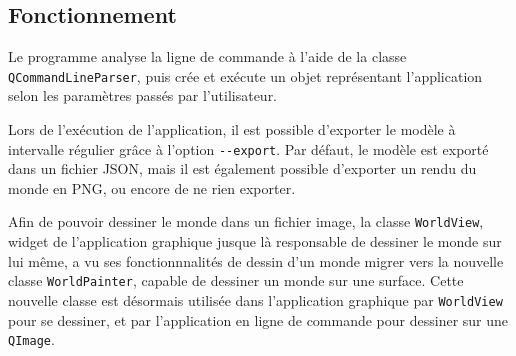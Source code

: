 \subsection{Fonctionnement}

Le programme analyse la ligne de commande à l'aide de la classe \verb|QCommandLineParser|, puis crée et exécute un objet représentant l'application selon les paramètres passés par l'utilisateur.

Lors de l'exécution de l'application, il est possible d'exporter le modèle à intervalle régulier grâce à l'option \verb|--export|. Par défaut, le modèle est exporté dans un fichier JSON, mais il est également possible d'exporter un rendu du monde en PNG, ou encore de ne rien exporter.

Afin de pouvoir dessiner le monde dans un fichier image, la classe \verb|WorldView|, widget de l'application graphique jusque là responsable de dessiner le monde sur lui même, a vu ses fonctionnnalités de dessin d'un monde migrer vers la nouvelle classe \verb|WorldPainter|, capable de dessiner un monde sur une surface.
Cette nouvelle classe est désormais utilisée dans l'application graphique par \verb|WorldView| pour se dessiner, et par l'application en ligne de commande pour dessiner sur une \verb|QImage|.

